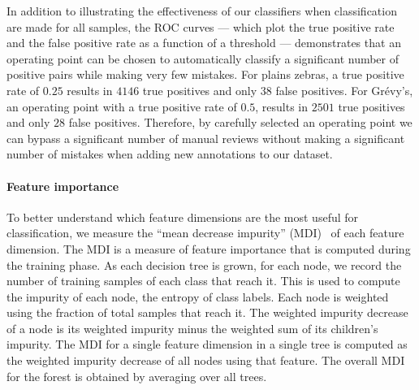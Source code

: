         In addition to illustrating the effectiveness of our classifiers when classification are made for all
          samples, the ROC curves --- which plot the true positive rate and the false positive rate as a function
          of a threshold --- demonstrates that an operating point can be chosen to automatically classify a
          significant number of positive pairs while making very few mistakes.
        For plains zebras, a true positive rate of $0.25$ results in $4146$ true positives and only $38$ false
          positives.
        For Grévy's, an operating point with a true positive rate of $0.5$, results in $2501$ true positives and
          only $28$ false positives.
        Therefore, by carefully selected an operating point we can bypass a significant number of manual reviews
          without making a significant number of mistakes when adding new annotations to our dataset.


        \PositiveHist{}

        \PositiveROC{}

        \FloatBarrier{}
        \paragraph{Feature importance}

        To better understand which feature dimensions are the most useful for classification, we measure the
          ``mean decrease impurity'' (MDI)~\cite{louppe2014understanding} of each feature dimension.
        The MDI is a measure of feature importance that is computed during the training phase.
        As each decision tree is grown, for each node, we record the number of training samples of each class
          that reach it.
        This is used to compute the impurity of each node, \ie{} the entropy of class labels.
        Each node is weighted using the fraction of total samples that reach it.
        The weighted impurity decrease of a node is its weighted impurity minus the weighted sum of its
          children's impurity.
        The MDI for a single feature dimension in a single tree is computed as the weighted impurity decrease of
          all nodes using that feature.
        The overall MDI for the forest is obtained by averaging over all trees.


